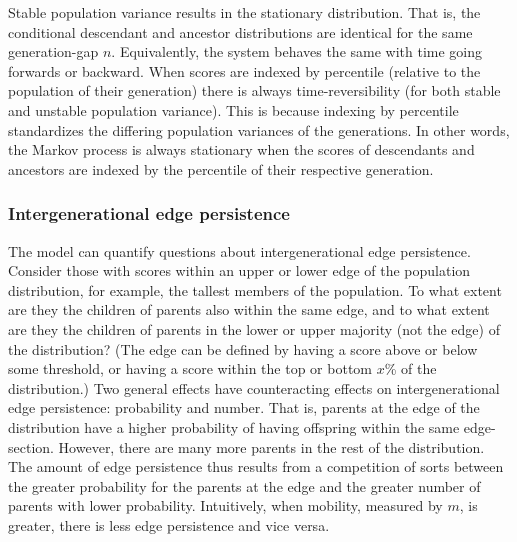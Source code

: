 \documentclass[a4paper,11pt]{article} %
\begin{document}
Stable population variance results in the stationary distribution. That is, the conditional descendant and ancestor distributions are identical for the same generation-gap $n$. Equivalently, the system behaves the same with time going forwards or backward. When scores are indexed by percentile (relative to the population of their generation) there is always time-reversibility (for both stable and unstable population variance). This is because indexing by percentile standardizes the differing population variances of the generations. In other words, the Markov process is always stationary when the scores of descendants and ancestors are indexed by the percentile of their respective generation. 

\subsubsection*{Intergenerational edge persistence}

The model can quantify questions about intergenerational edge persistence. Consider those with scores within an upper or lower edge of the population distribution, for example, the tallest members of the population. To what extent are they the children of parents also within the same edge, and to what extent are they the children of parents in the lower or upper majority (not the edge) of the distribution? (The edge can be defined by having a score above or below some threshold, or having a score within the top or bottom $x$\% of the distribution.) Two general effects have counteracting effects on intergenerational edge persistence: probability and number. That is, parents at the edge of the distribution have a higher probability of having offspring within the same edge-section. However, there are many more parents in the rest of the distribution. The amount of edge persistence thus results from a competition of sorts between the greater probability for the parents at the edge and the greater number of parents with lower probability. Intuitively, when mobility, measured by $m$, is greater, there is less edge persistence and vice versa. 
\end{document}
